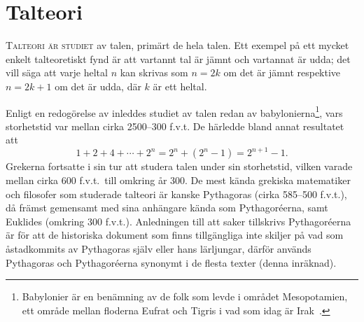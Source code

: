 \chapter{Talteori}
\label{ch:Talteori}%
\lettrine{T}{alteori är studiet} av talen, primärt de hela talen.
Ett exempel på ett mycket enkelt talteoretiskt fynd är att vartannt tal är 
jämnt och vartannat är udda; det vill säga att varje heltal \(n\) kan skrivas 
som \(n = 2k\) om det är jämnt respektive \(n = 2k+1\) om det är udda, där 
\(k\) är ett heltal.

Enligt en redogörelse av \citet{Kline1990mtf1} inleddes studiet av talen redan 
av babylonierna\footnote{%
  Babylonier är en benämning av de folk som levde i området Mesopotamien, ett 
  område mellan floderna Eufrat och Tigris i vad som idag är 
  Irak~\cite{Kline1990mtf1}.
}, vars storhetstid var mellan cirka 2500--300 f.v.t.\@
De härledde bland annat resultatet att \[1 + 2 + 4 + \cdots + 2^n = 2^n + (2^n 
- 1) = 2^{n+1} - 1.\]
Grekerna fortsatte i sin tur att studera talen under sin storhetstid, vilken 
varade mellan cirka 600 f.v.t.\ till omkring år 300.
De mest kända grekiska matematiker och filosofer som studerade talteori är 
kanske Pythagoras (cirka 585--500 f.v.t.), då främst 
gemensamt med sina anhängare kända som Pythagoréerna, samt 
Euklides (omkring 300 f.v.t.).
Anledningen till att saker tillskrivs Pythagoréerna är för att de historiska 
dokument som finns tillgängliga inte skiljer på vad som åstadkommits av 
Pythagoras själv eller hans lärljungar, därför används Pythagoras och 
Pythagoréerna synonymt i de flesta texter (denna inräknad).

